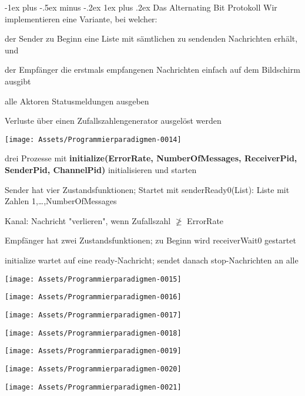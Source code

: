 \documentclass[10pt]{article}
\makeatletter
\renewcommand{\subsubsection}{\@startsection{subsubsection}{3}{0mm}%
                                {-1ex plus -.5ex minus -.2ex}%
                                {1ex plus .2ex}%
                                {\normalfont\small\bfseries}}
\makeatother
\begin{document}
\begin{itemize*}
\subsubsection{Das Alternating Bit Protokoll}
Wir implementieren eine Variante, bei welcher: 
\begin{itemize*}
  \item der Sender zu Beginn eine Liste mit sämtlichen zu sendenden Nachrichten erhält, und
  \item der Empfänger die erstmals empfangenen Nachrichten einfach auf dem Bildschirm ausgibt
  \item alle Aktoren Statusmeldungen ausgeben
  \item Verluste über einen Zufallszahlengenerator ausgelöst werden
\end{itemize*}
\begin{center}
  \centering
  \texttt{[image: Assets/Programmierparadigmen-0014]}
\end{center}
drei Prozesse mit \textbf{initialize(ErrorRate, NumberOfMessages, ReceiverPid, SenderPid, ChannelPid)} initialisieren und starten
\begin{itemize*}
  \item Sender hat vier Zustandsfunktionen; Startet mit senderReady0(List): Liste mit Zahlen 1,…,NumberOfMessages
  \item Kanal: Nachricht "verlieren", wenn Zufallszahl $\ngeq$ ErrorRate
  \item Empfänger hat zwei Zustandsfunktionen; zu Beginn wird receiverWait0 gestartet
  \item initialize wartet auf eine ready-Nachricht; sendet danach stop-Nachrichten an alle
\end{itemize*}
\begin{center}
  \centering
  \texttt{[image: Assets/Programmierparadigmen-0015]}
\end{center}
\begin{center}
  \centering
  \texttt{[image: Assets/Programmierparadigmen-0016]}
\end{center}
\begin{center}
  \centering
  \texttt{[image: Assets/Programmierparadigmen-0017]}
\end{center}
\begin{center}
  \centering
  \texttt{[image: Assets/Programmierparadigmen-0018]}
\end{center}
\begin{center}
  \centering
  \texttt{[image: Assets/Programmierparadigmen-0019]}
\end{center}
\begin{center}
  \centering
  \texttt{[image: Assets/Programmierparadigmen-0020]}
\end{center}
\begin{center}
  \centering
  \texttt{[image: Assets/Programmierparadigmen-0021]}
\end{center}\clearpage

\end{itemize*}
\end{document}
